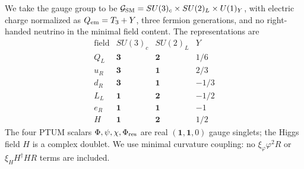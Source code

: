 \documentclass[epj]{svjour}
\begin{document}
We take the gauge group to be
\(\mathcal G_{\rm SM}=SU(3)_c\times SU(2)_L\times U(1)_Y\),
with electric charge normalized as \(Q_{\rm em}=T_3+Y\), three
fermion generations, and no right-handed neutrino in the minimal
field content. The representations are
\begin{equation}
\begin{array}{c|ccc}
\text{field} & SU(3)_c & SU(2)_L & Y\\ \hline
Q_L & \mathbf 3 & \mathbf 2 & 1/6\\
u_R & \mathbf 3 & \mathbf 1 & 2/3\\
d_R & \mathbf 3 & \mathbf 1 & -1/3\\
L_L & \mathbf 1 & \mathbf 2 & -1/2\\
e_R & \mathbf 1 & \mathbf 1 & -1\\
H   & \mathbf 1 & \mathbf 2 & 1/2
\end{array}
\label{eq:sm_representations}
\end{equation}
The four PTUM scalars \(\Phi,\psi,\chi,\Phi_{\rm res}\) are real
\((\mathbf 1,\mathbf 1,0)\) gauge singlets; the Higgs field \(H\) is
a complex doublet. We use minimal curvature coupling: no
\(\xi_\varphi\varphi^2R\) or \(\xi_H H^\dagger H R\) terms are included.
\end{document}
